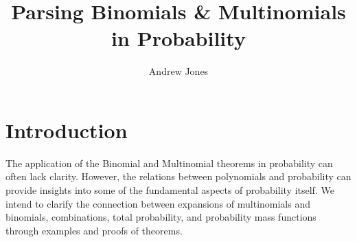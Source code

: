 \documentclass{article}
\title{Parsing Binomials \& Multinomials in Probability}
\author{Andrew Jones}\date{}
\theoremstyle{plain}
\theoremstyle{definition}
\theoremstyle{remark}
\begin{document}
\maketitle



\section*{Introduction}
The application of the Binomial and Multinomial theorems in probability can often lack clarity. However, the relations between polynomials and probability can provide insights into some of the fundamental aspects of probability itself. We intend to clarify the connection between expansions of multinomials and binomials, combinations, total probability, and probability mass functions through examples and proofs of theorems.

\end{document}
